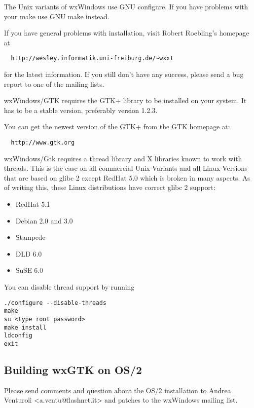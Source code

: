 
The Unix variants of wxWindows use GNU configure. If you have problems with your 
make use GNU make instead.

If you have general problems with installation, visit Robert Roebling's homepage at 

\begin{verbatim}
  http://wesley.informatik.uni-freiburg.de/~wxxt
\end{verbatim}
  
for the latest information. If you still don't have any success, please send a bug 
report to one of the mailing lists.


wxWindows/GTK requires the GTK+ library to be installed on your system. It has to 
be a stable version, preferably version 1.2.3.

You can get the newest version of the GTK+ from the GTK homepage at:

\begin{verbatim}
  http://www.gtk.org
\end{verbatim}
  
wxWindows/Gtk requires a thread library and X libraries known to work with threads. 
This is the case on all commercial Unix-Variants and all Linux-Versions that are 
based on glibc 2 except RedHat 5.0 which is broken in many aspects. As of writing 
this, these Linux distributions have correct glibc 2 support:

\begin{itemize}\itemsep=0pt
\item RedHat 5.1
\item Debian 2.0 and 3.0
\item Stampede
\item DLD 6.0
\item SuSE 6.0
\end{itemize}
 
You can disable thread support by running 

\begin{verbatim}
./configure --disable-threads
make
su <type root password>
make install
ldconfig
exit
\end{verbatim}
  
\subsection{Building wxGTK on OS/2}

Please send comments and question about the OS/2 installation
to Andrea Venturoli <a.ventu@flashnet.it> and patches to
the wxWindows mailing list.

